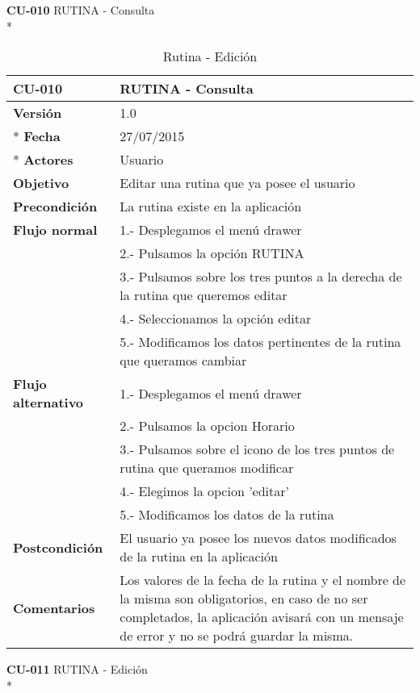 \documentclass[../pfc.tex]{subfiles}
\begin{document}
	\textbf{CU-010}	RUTINA - Consulta\\*
		
		\begin{table}[H]
			\centering
			\begin{tabular}[t]{|p{3cm}|p{9.5cm}|}
				\hline \textbf{CU-010} & \textbf{RUTINA - Consulta} \\*
				\hline\hline \textbf{Versión} & 1.0 \\ *
				\hline\hline \textbf{Fecha} & 27/07/2015 \\ *
				\hline\textbf{Actores} 	& Usuario\\*
				\hline \textbf{Objetivo} & Editar una rutina que ya posee el usuario\\* 			
				\hline \textbf{Precondición} & La rutina existe en la aplicación\\* 
				\hline \textbf{Flujo normal} & 1.- Desplegamos el menú drawer \\* 
				& 2.- Pulsamos la opción RUTINA\\*	
				& 3.- Pulsamos sobre los tres puntos a la derecha de la rutina que queremos editar\\*	
				& 4.- Seleccionamos la opción editar\\*	
				& 5.- Modificamos los datos pertinentes de la rutina que queramos cambiar\\*	
				\hline \textbf{Flujo alternativo} & 1.- Desplegamos el menú drawer \\* 
				& 2.- Pulsamos la opcion Horario \\*	
				& 3.- Pulsamos sobre el icono de los tres puntos de rutina que queramos modificar \\*	
				& 4.- Elegimos la opcion 'editar'\\*	
				& 5.- Modificamos los datos de la rutina\\*	
				\hline \textbf{Postcondición} & El usuario ya posee los nuevos datos modificados de la rutina en la aplicación \\* 
				\hline \textbf{Comentarios}   & Los valores de la fecha de la rutina y el nombre de la misma son obligatorios, en caso de no ser completados, la aplicación avisará con un mensaje de error y no se podrá guardar la misma.\\*
				\hline
			\end{tabular}
			\caption{Rutina - Edición}
			\label{tabla:caso010}
		\end{table}
		
	\textbf{CU-011}	RUTINA - Edición\\*
		
\end{document}

